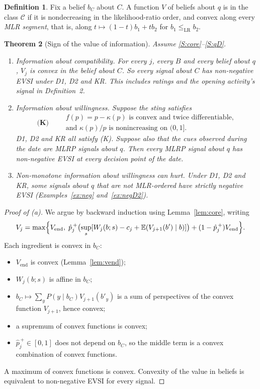 \documentclass[11pt,a4paper]{article}
\newtheorem{theorem}{Theorem}
\theoremstyle{definition}
\newtheorem{definition}[theorem]{Definition}
\theoremstyle{remark}
\newcommand{\E}{\mathbb{E}}
\newcommand{\Vend}{V_{\mathrm{end}}}
\newcommand{\pp}{\hat p}
\begin{document}
\begin{definition}
Fix a belief $b_C$ about $C$. A function $V$ of beliefs about $q$ is in the class $\mathcal C$ if it is nondecreasing in the likelihood-ratio order, and convex along every \emph{MLR segment}, that is, along $t\mapsto(1-t)b_1+tb_2$ for $b_1\le_{\mathrm{LR}}b_2$.
\end{definition}

\begin{theorem}[Sign of the value of information]\label{thm:voi}
Assume \ref{S:core}--\ref{S:qD}.
\begin{enumerate}[label=(\alph*)]
\item \emph{Information about compatibility.} For every $j$, every $B$ and every belief about $q$, $V_j$ is convex in the belief about $C$. So every signal about $C$ has non-negative EVSI under D1, D2 and KR. This includes ratings and the opening activity's signal in Definition~2.
\item \emph{Information about willingness.} Suppose the sting satisfies
\begin{equation*}
\textbf{(K)}\qquad
\begin{gathered}
f(p)=p-\kappa(p)\text{ is convex and twice differentiable,}\\
\text{and }\kappa(p)/p\text{ is nonincreasing on }(0,1].
\end{gathered}
\end{equation*}
D1, D2 and KR all satisfy (K). Suppose also that the cues observed during the date are MLRP signals about $q$. Then every MLRP signal about $q$ has non-negative EVSI at every decision point of the date.
\item \emph{Non-monotone information about willingness can hurt.} Under D1, D2 and KR, some signals about $q$ that are not MLR-ordered have strictly negative EVSI (Examples~\ref{ex:neg} and~\ref{ex:negD2}).
\end{enumerate}
\end{theorem}

\begin{proof}[Proof of (a)]
We argue by backward induction using Lemma~\ref{lem:core}, writing
\[
V_j=\max\Bigl\{\Vend,\;\pp_j^{\,+}\bigl(\sup_s[W_j(b;s)-c_j+\E(V_{j+1}(b')\mid b)]\bigr)+(1-\pp_j^{\,+})\Vend\Bigr\}.
\]
Each ingredient is convex in $b_C$:
\begin{itemize}[nosep]
\item $\Vend$ is convex (Lemma~\ref{lem:vend});
\item $W_j(b;s)$ is affine in $b_C$;
\item $b_C\mapsto\sum_yP(y\mid b_C)V_{j+1}(b'_y)$ is a sum of perspectives of the convex function $V_{j+1}$, hence convex;
\item a supremum of convex functions is convex;
\item $\pp_j^{\,+}\in[0,1]$ does not depend on $b_C$, so the middle term is a convex combination of convex functions.
\end{itemize}
A maximum of convex functions is convex. Convexity of the value in beliefs is equivalent to non-negative EVSI for every signal.
\end{proof}
\end{document}
